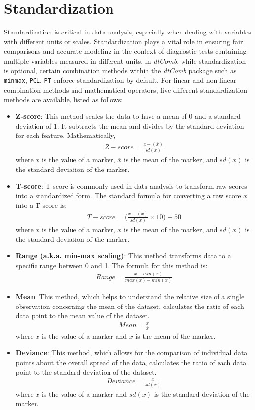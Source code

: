 \documentclass[10pt]{article}
\newcommand{\dtComb}{\textit{dtComb}}
\begin{document}
\section{Standardization}
Standardization is critical in data analysis, especially when dealing with variables with different units or scales. Standardization plays a vital role in ensuring fair comparisons and accurate modeling in the context of diagnostic tests containing multiple variables measured in different units. In \dtComb{}, while standardization is optional, certain combination methods within the \dtComb{} package such as \texttt{minmax}, \texttt{PCL}, \texttt{PT} enforce standardization by default. For linear and non-linear combination methods and mathematical operators, five different standardization methods are available, listed as follows:
\begin{itemize}
  \item \textbf{Z-score}: This method scales the data to have a mean of 0 and a standard deviation of 1. It subtracts the mean and divides by the standard deviation for each feature. Mathematically,
\begin{gather*} 
    Z-score = \frac{x - (\overline x)}{sd(x)}
    \end{gather*}
     where $x$ is the value of a marker, $\overline{x}$ is the mean of the marker, and $sd(x)$ is the standard deviation of the marker.
     \item \textbf{T-score}: T-score is commonly used in data analysis to transform raw scores into a standardized form. The standard formula for converting a raw score $x$ into a T-score is:
    \begin{gather*} 
    T-score = \Biggl(\frac{x - (\overline x)}{sd(x)}\times 10 \Biggl) +50
    \end{gather*}
    where $x$ is the value of a marker, $\overline{x}$ is the mean of the marker, and $sd(x)$ is the standard deviation of the marker.
    \item \textbf{Range (a.k.a. min-max scaling)}: This method transforms data to a specific range between 0 and 1. The formula for this method is:
  \begin{gather*} 
    Range = \frac{x - min(x)}{max(x) - min(x)}
    \end{gather*}
    \item \textbf{Mean}: This method, which helps to understand the relative size of a single observation concerning the mean of the dataset, calculates the ratio of each data point to the mean value of the dataset.
      \begin{gather*} 
   Mean =  \frac{x}{\overline{x}}
    \end{gather*}
    where $x$ is the value of a marker and $\overline{x}$ is the mean of the marker.
    \item \textbf{Deviance}: This method, which allows for the comparison of individual data points about the overall spread of the data, calculates the ratio of each data point to the standard deviation of the dataset.
   \begin{gather*} 
   Deviance = \frac{x}{sd(x)}
    \end{gather*}
    where $x$ is the value of a marker and $sd(x)$ is the standard deviation of the marker.
\end{itemize}
\end{document}
